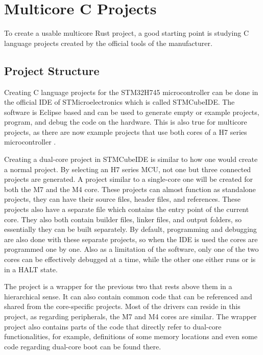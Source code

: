 \chapter{Multicore C Projects}

To create a usable multicore Rust project, a good starting point is studying C language projects created by the official tools of the manufacturer.

\section{Project Structure}

Creating C language projects for the STM32H745 microcontroller can be done in the official IDE of STMicroelectronics which is called STMCubeIDE. The software is Eclipse based and can be used to generate empty or example projects, program, and debug the code on the hardware. This is also true for multicore projects, as there are now example projects that use both cores of a H7 series microcontroller \cite{CExamples}.

Creating a dual-core project in STMCubeIDE is similar to how one would create a normal project. By selecting an H7 series MCU, not one but three connected projects are generated. A project similar to a single-core one will be created for both the M7 and the M4 core. These projects can almost function as standalone projects, they can have their source files, header files, and references. These projects also have a separate  file which contains the entry point of the current core. They also both contain builder files, linker files, and output folders, so essentially they can be built separately. By default, programming and debugging are also done with these separate projects, so when the IDE is used the cores are programmed one by one. Also as a limitation of the software, only one of the two cores can be effectively debugged at a time, while the other one either runs or is in a HALT state.

The project is a wrapper for the previous two that rests above them in a hierarchical sense. It can also contain common code that can be referenced and shared from the core-specific projects. Most of the drivers can reside in this project, as regarding peripherals, the M7 and M4 cores are similar. The wrapper project also contains parts of the code that directly refer to dual-core functionalities, for example, definitions of some memory locations and even some code regarding dual-core boot can be found there.

